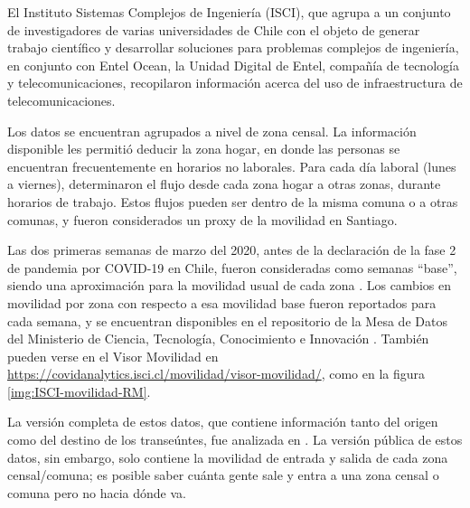 El Instituto Sistemas Complejos de Ingeniería (ISCI), que agrupa a un conjunto de investigadores de varias universidades de Chile con el objeto de generar trabajo científico y desarrollar soluciones para problemas complejos de ingeniería,
 en conjunto con Entel Ocean, la Unidad Digital de Entel, 
compañía de tecnología y telecomunicaciones, recopilaron información acerca del uso de infraestructura de telecomunicaciones.

Los datos se encuentran agrupados a nivel de zona censal. La información disponible les permitió deducir la zona hogar, en donde las personas se encuentran frecuentemente en horarios no laborales. Para cada día laboral (lunes a viernes), determinaron el flujo desde cada zona hogar a otras zonas, durante horarios de trabajo. Estos flujos pueden ser dentro de la misma comuna o a otras comunas, y fueron considerados un proxy de la movilidad en Santiago. %

Las dos primeras semanas de marzo del 2020, antes de la declaración de la fase 2 de pandemia por COVID-19 en Chile, fueron consideradas como semanas ``base'', siendo una aproximación para la movilidad usual de cada zona \cite{Olivares2020}. Los cambios en movilidad por zona con respecto a esa movilidad base fueron reportados para cada semana, y se encuentran disponibles en el repositorio de la Mesa de Datos del Ministerio de Ciencia, Tecnología, Conocimiento e Innovación \cite{MINCIENCIA}. También pueden verse en el Visor Movilidad en \url{https://covidanalytics.isci.cl/movilidad/visor-movilidad/}, como en la figura \ref{img:ISCI-movilidad-RM}.

La versión completa de estos datos, que contiene información tanto del origen como del destino de los transeúntes, fue analizada en \cite{Carranza2020}. La versión pública de estos datos, sin embargo, solo contiene la movilidad de entrada y salida de cada zona censal/comuna; es posible saber cuánta gente sale y entra a una zona censal o comuna pero no hacia dónde va.

